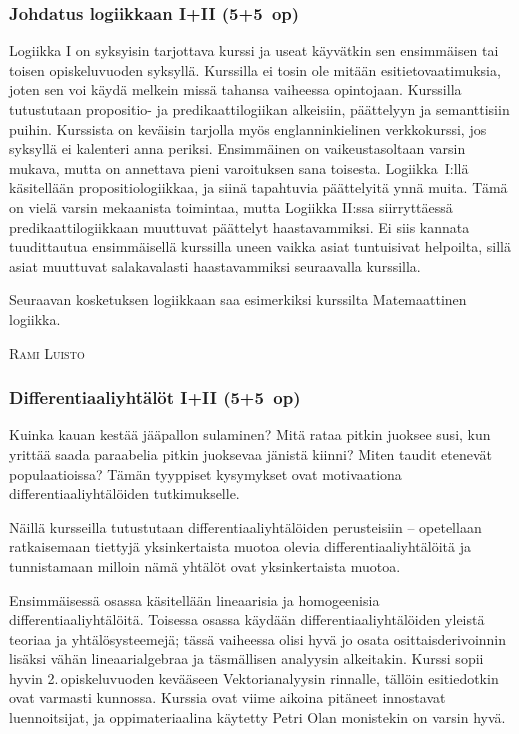 \documentclass[../ala_hataile.tex]{subfiles}
\begin{document}
	\subsubsection*{Johdatus logiikkaan I+II (5+5~op)}
	Logiikka I on syksyisin tarjottava kurssi
	ja useat käyvätkin sen ensimmäisen tai
	toisen opiskeluvuoden syksyllä. Kurssilla
	ei tosin ole mitään esi\-tieto\-vaatimuksia,
	joten sen voi käydä melkein missä tahansa
	vaiheessa opintojaan. Kurssilla tutustutaan
	propositio- ja predikaatti\-logiikan alkeisiin,
	päättelyyn ja semanttisiin puihin. Kurssista on keväisin tarjolla myös
	englanninkielinen verkkokurssi, jos syksyllä ei kalenteri anna periksi.
	Ensimmäinen on vaikeustasoltaan varsin mukava,
	mutta on annettava pieni varoituksen
	sana toisesta. Logiikka~I:llä
	käsitellään propositio\-logiikkaa, ja siinä tapahtuvia
	päättelyitä ynnä muita. Tämä on
	vielä varsin mekaanista toimintaa, mutta
	Logiikka II:ssa siirryttäessä
	predikaatti\-logiikkaan muuttuvat päättelyt
	haastavammiksi. Ei siis kannata tuudittautua
	ensimmäisellä kurssilla uneen vaikka
	asiat tuntuisivat helpoilta, sillä asiat muuttuvat
	salakavalasti haastavammiksi seuraavalla kurssilla.
	
	Seuraavan kosketuksen logiikkaan saa esimerkiksi
	kurssilta Matemaattinen logiikka.
	
	\vspace{0.5cm}
	\noindent\textsc{Rami Luisto}
	
	\subsubsection*{Differentiaaliyhtälöt I+II (5+5~op)}
	Kuinka kauan kestää jääpallon sulaminen?
	Mitä rataa pitkin juoksee susi, kun
	yrittää saada paraabelia pitkin juoksevaa
	jänistä kiinni? Miten taudit etenevät populaatioissa?
	Tämän tyyppiset kysymykset
	ovat motivaationa differentiaaliyhtälöiden
	tutkimukselle.
	
	Näillä kursseilla tutustutaan differentiaaliyhtälöiden
	perusteisiin -- opetellaan
	ratkaisemaan tiettyjä yksinkertaista muotoa
	olevia differentiaaliyhtälöitä ja tunnistamaan
	milloin nämä yhtälöt ovat yksinkertaista
	muotoa.
	
	Ensimmäisessä osassa käsitellään lineaarisia
	ja homogeenisia differentiaaliyhtälöitä.
	Toisessa osassa käydään differentiaaliyhtälöiden
	yleistä teoriaa ja yhtälösysteemejä;
	tässä vaiheessa olisi hyvä jo osata
	osittaisderivoinnin lisäksi vähän lineaarialgebraa
	ja täsmällisen analyysin alkeitakin.
	Kurssi sopii hyvin 2.\,opiskeluvuoden kevääseen
	Vektorianalyysin rinnalle, tällöin
	esitiedotkin ovat varmasti kunnossa. Kurssia
	ovat viime aikoina pitäneet innostavat
	luennoitsijat, ja oppimateriaalina käytetty
	Petri Olan monistekin on varsin hyvä.
	
\end{document}
